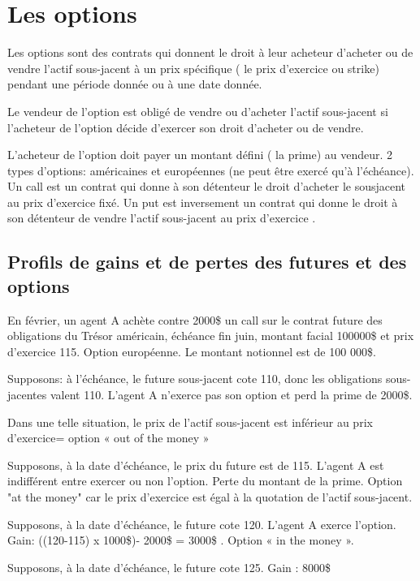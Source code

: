 	
\section{Les options}

Les options sont des contrats qui donnent le droit à leur acheteur d'acheter 
ou de vendre l'actif sous-jacent à un prix spécifique ( le prix d'exercice ou 
strike) pendant une période donnée ou à une date donnée. 

Le vendeur de l'option est obligé de vendre ou d'acheter l'actif sous-jacent 
si l'acheteur de l'option décide d'exercer son droit d'acheter ou de vendre.

L'acheteur de l'option doit payer un montant défini ( la prime) au vendeur. 
2 types d'options: américaines et européennes (ne peut être exercé qu'à l'échéance).
Un call est un contrat qui donne à son détenteur le droit d'acheter le sousjacent au prix d'exercice fixé. 
Un put est inversement un contrat qui donne le droit à son détenteur de 
vendre l'actif sous-jacent au prix d'exercice .

	\subsection{Profils de gains et de pertes des futures et des options}
	
	En février, un agent A achète contre 2000\$ un call sur le contrat future des 
obligations du Trésor américain, échéance fin juin, montant facial 100000\$ 
et prix d'exercice 115. Option européenne. Le montant notionnel est de 100 000\$.

Supposons: à l'échéance, le future sous-jacent cote 110, donc les 
obligations sous-jacentes valent 110. L'agent A n'exerce pas son option et 
perd la prime de 2000\$.

Dans une telle situation, le prix de l'actif sous-jacent est inférieur au prix 
d'exercice= option « out of the money » 

Supposons, à la date d'échéance, le prix du future est de 115. L'agent A est 
indifférent entre exercer ou non l'option. Perte du montant de la prime. 
Option "at the money" car le prix d'exercice est égal à la quotation de l'actif sous-jacent.

Supposons, à la date d'échéance, le future cote 120. L'agent A exerce 
l'option. Gain: ((120-115) x 1000\$)- 2000\$ = 3000\$ . Option « in the money ». 

Supposons, à la date d'échéance, le future cote 125. Gain : 8000\$

